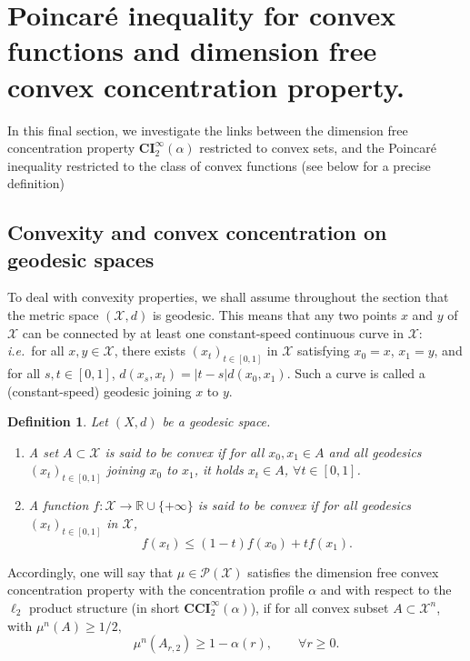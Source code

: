 \documentclass[11pt]{amsart}
\newtheorem{defi}[equation]{Definition}
\numberwithin{equation}{section}
\begin{document}
\section{Poincar\'e inequality for convex functions and dimension free convex concentration property.}

In this final section, we investigate the links between the dimension free concentration property  $\mathbf{CI}^\infty_2(\alpha)$ restricted to convex sets, and the Poincar\'e inequality restricted to the class of convex functions (see below for a precise definition)

\subsection{Convexity and convex concentration on geodesic spaces}
To deal with convexity properties, we shall assume throughout the section that the metric space $({\mathcal{X}},d)$ is  geodesic. This means that any two points $x$ and $y $ of ${\mathcal{X}}$ can be connected  by  at least one  constant-speed continuous curve in ${\mathcal{X}}$: \textit{i.e.}\ for all $x,y \in {\mathcal{X}}$, there exists $(x_t)_{t\in[0,1]}$ in ${\mathcal{X}}$ satisfying $x_0=x$, $x_1=y$, and for all $s,t\in[0,1]$, $d(x_s,x_t)=|t-s| d(x_0,x_1)$. Such a curve is called a 
(constant-speed) geodesic joining $x$ to $y$.

\begin{defi} Let $(X,d)$ be a geodesic space.
\begin{enumerate}[label={\bfseries (\roman*)}]
\item A  set $A\subset {\mathcal{X}}$ is said to be convex if for all  $x_0, x_1 \in A$ and all geodesics $(x_t)_{t\in[0,1]}$ joining $x_0$ to $x_1$, it holds $x_t\in A$, $\forall t \in [0,1]$.
\item A function $f:{\mathcal{X}}\to {\mathbb{R}}\cup\{+\infty\}$ is said to be convex if for all geodesics $(x_t)_{t\in[0,1]}$ in ${\mathcal{X}}$,
\[f(x_t)\leq (1-t)f(x_0) +t f(x_1).\]
\end{enumerate}
\end{defi}

Accordingly, one will say that $\mu \in \mathcal{P}({\mathcal{X}})$ satisfies the dimension free convex concentration property with the concentration profile $\alpha$ and with respect to the $\ell_2$ product structure (in short $\mathbf{CCI}_2^\infty(\alpha)$), if for all convex subset $A\subset {\mathcal{X}}^n$, with $\mu^n(A)\geq 1/2,$ 
\begin{equation}\label{eq:CCI}
\mu^n(A_{r,2})\geq 1-\alpha(r),\qquad \forall r\geq 0.
\end{equation}
\end{document}

